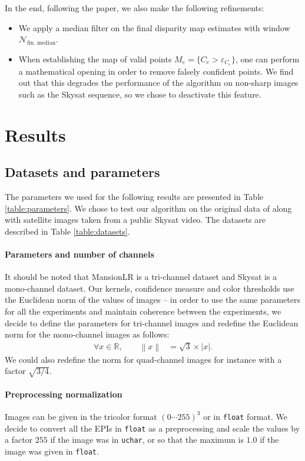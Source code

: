 \documentclass{article}
\newcommand{\abs} [1] {\left| #1 \right|}
\newcommand{\norm}[1]{\left\lVert#1\right\rVert}
\def\R{\mathbb{R}}
\theoremstyle{definition}
\begin{document}
In the end, following the paper, we also make the following refinements:
\begin{itemize}
 \item We apply a median filter on the final disparity map estimates with window $\mathcal{N}_\text{fin. median}$.
 \item When establishing the map of valid points $M_e = \{C_e > \varepsilon_{C_e}\}$, one can perform a mathematical opening in order to remove falsely confident points. We find out that this degrades the performance of the algorithm on non-sharp images such as the Skysat sequence, so we chose to deactivate this feature.
\end{itemize}


\clearpage
\section{Results}


\subsection{Datasets and parameters}


The parameters we used for the following results are presented in Table \ref{table:parameters}. We chose to test our algorithm on the original data of \cite{art:kim13:lfields} along with satellite images taken from a public Skysat video. The datasets are described in Table \ref{table:datasets}.


\paragraph{Parameters and number of channels} It should be noted that MansionLR is a tri-channel dataset and Skysat is a mono-channel dataset. Our kernels, confidence measure and color thresholds use the Euclidean norm of the values of images -- in order to use the same parameters for all the experiments and maintain coherence between the experiments, we decide to define the parameters for tri-channel images and redefine the Euclidean norm for the mono-channel images as follows:
\begin{align}
 \forall x \in \R, \qquad \norm{x} &= \sqrt{3} \times \abs{x}.
\end{align}
We could also redefine the norm for quad-channel images for instance with a factor $\sqrt{3/4}$.


\paragraph{Preprocessing normalization} Images can be given in the tricolor format $(0\cdots 255)^3$ or in \verb#float# format. We decide to convert all the EPIs in \verb#float# as a preprocessing and scale the values by a factor $255$ if the image was in \verb#uchar#, or so that the maximum is $1.0$ if the image was given in \verb#float#. 
\end{document}
